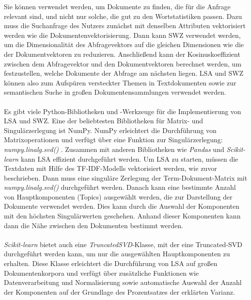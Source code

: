 Sie können verwendet werden, um Dokumente zu finden, die für die Anfrage relevant sind, und nicht nur solche, die gut zu den Wortstatistiken passen. 
Dazu muss die Suchanfrage des Nutzers zunächst mit denselben Attributen vektorisiert werden wie die Dokumentenvektorisierung. 
Dann kann \ac{SWZ} verwendet werden, um die Dimensionalität des Abfragevektors auf die gleichen Dimensionen wie die der Dokumentvektoren zu reduzieren. 
Anschließend kann der Kosinuskoeffizient zwischen dem Abfragevektor und den Dokumentvektoren berechnet werden, um festzustellen, welche Dokumente der Abfrage am nächsten liegen. 
\ac{LSA} und \ac{SWZ} können also zum Aufspüren versteckter Themen in Textdokumenten sowie zur semantischen Suche in großen Dokumentensammlungen verwendet werden. \cite{lane_natural_2019}\\\\
Es gibt viele Python-Bibliotheken und -Werkzeuge für die Implementierung von \ac{LSA} und \ac{SWZ}. 
Eine der beliebtesten Bibliotheken für Matrix- und Singulärzerlegung ist NumPy. 
NumPy erleichtert die Durchführung von Matrixoperationen und verfügt über eine Funktion zur Singulärzerlegung: \textit{numpy.linalg.svd()} \cite{numpy}.
Zusammen mit anderen Bibliotheken wie \textit{Pandas} und \textit{Scikit-learn} kann \ac{LSA} effizient durchgeführt werden. 
Um \ac{LSA} zu starten, müssen die Textdaten mit Hilfe des \ac{TF-IDF}-Modells vektorisiert werden, wie zuvor beschrieben. 
Dann muss eine singuläre Zerlegung der Term-Dokument-Matrix mit \textit{numpy.linalg.svd()} durchgeführt werden. 
Danach kann eine bestimmte Anzahl von Hauptkomponenten (Topics) ausgewählt werden, die zur Darstellung der Dokumente verwendet werden. 
Dies kann durch die Auswahl der Komponenten mit den höchsten Singulärwerten geschehen. 
Anhand dieser Komponenten kann dann die Nähe zwischen den Dokumenten bestimmt werden.\\\\ 
\textit{Scikit-learn} bietet auch eine \textit{TruncatedSVD}-Klasse, mit der eine Truncated-\ac{SVD} durchgeführt werden kann, um nur die ausgewählten Hauptkomponenten zu erhalten. 
Diese Klasse erleichtert die Durchführung von \ac{LSA} auf großen Dokumentenkorpora und verfügt über zusätzliche Funktionen wie Datenverarbeitung und Normalisierung sowie automatische Auswahl der Anzahl der Komponenten auf der Grundlage des Prozentsatzes der erklärten Varianz. \cite{scikit-learn}
